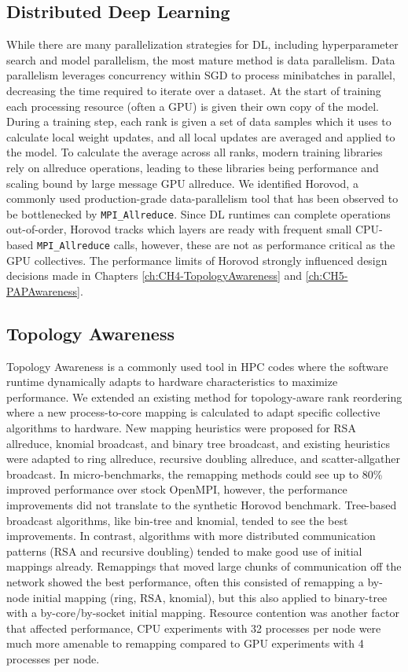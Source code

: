 \subsection{Distributed Deep Learning}
While there are many parallelization strategies for \gls{DL}, including hyperparameter search and model parallelism, the most mature method is data parallelism. 
Data parallelism leverages concurrency within \gls{SGD} to process minibatches in parallel, decreasing the time required to iterate over a dataset.
At the start of training each processing resource (often a \gls{GPU}) is given their own copy of the model.
During a training step, each rank is given a set of data samples which it uses to calculate local weight updates, and all local updates are averaged and applied to the model.
To calculate the average across all ranks, modern training libraries rely on allreduce operations, leading to these libraries being performance and scaling bound by large message \gls{GPU} allreduce.
We identified Horovod, a commonly used production-grade data-parallelism tool that has been observed to be bottlenecked by \texttt{MPI\_Allreduce}.
Since \gls{DL} runtimes can complete operations out-of-order, Horovod tracks which layers are ready with frequent small \gls{CPU}-based \texttt{MPI\_Allreduce} calls, however, these are not as performance critical as the \gls{GPU} collectives.
The performance limits of Horovod strongly influenced design decisions made in Chapters \ref{ch:CH4-TopologyAwareness} and \ref{ch:CH5-PAPAwareness}.

\subsection{Topology Awareness}
Topology Awareness is a commonly used tool in \gls{HPC} codes where the software runtime dynamically adapts to hardware characteristics to maximize performance.
We extended an existing method for topology-aware rank reordering where a new process-to-core mapping is calculated to adapt specific collective algorithms to hardware.
New mapping heuristics were proposed for \gls{RSA} allreduce, knomial broadcast, and binary tree broadcast, and existing heuristics were adapted to ring allreduce, recursive doubling allreduce, and scatter-allgather broadcast.
In micro-benchmarks, the remapping methods could see up to 80\% improved performance over stock OpenMPI, however, the performance improvements did not translate to the synthetic Horovod benchmark.
Tree-based broadcast algorithms, like bin-tree and knomial, tended to see the best improvements.
In contrast, algorithms with more distributed communication patterns (\gls{RSA} and recursive doubling) tended to make good use of initial mappings already.
Remappings that moved large chunks of communication off the network showed the best performance, often this consisted of remapping a by-node initial mapping (ring, \gls{RSA}, knomial), but this also applied to binary-tree with a by-core/by-socket initial mapping.
Resource contention was another factor that affected performance, \gls{CPU} experiments with 32 processes per node were much more amenable to remapping compared to \gls{GPU} experiments with 4 processes per node. 


